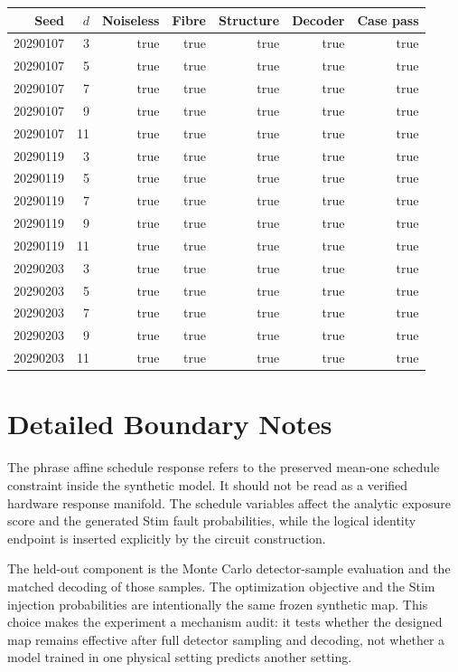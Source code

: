 \documentclass[11pt]{article}
\begin{document}
\begin{center}
\scriptsize
\begin{tabular}{rrrrrrr}
\toprule
Seed & $d$ & Noiseless & Fibre & Structure & Decoder & Case pass \\
\midrule
20290107 & 3 & true & true & true & true & true \\
20290107 & 5 & true & true & true & true & true \\
20290107 & 7 & true & true & true & true & true \\
20290107 & 9 & true & true & true & true & true \\
20290107 & 11 & true & true & true & true & true \\
20290119 & 3 & true & true & true & true & true \\
20290119 & 5 & true & true & true & true & true \\
20290119 & 7 & true & true & true & true & true \\
20290119 & 9 & true & true & true & true & true \\
20290119 & 11 & true & true & true & true & true \\
20290203 & 3 & true & true & true & true & true \\
20290203 & 5 & true & true & true & true & true \\
20290203 & 7 & true & true & true & true & true \\
20290203 & 9 & true & true & true & true & true \\
20290203 & 11 & true & true & true & true & true \\
\bottomrule
\end{tabular}
\end{center}

\clearpage
\section{Detailed Boundary Notes}
The phrase affine schedule response refers to the preserved mean-one schedule
constraint inside the synthetic model. It should not be read as a verified
hardware response manifold. The schedule variables affect the analytic exposure
score and the generated Stim fault probabilities, while the logical identity
endpoint is inserted explicitly by the circuit construction.

The held-out component is the Monte Carlo detector-sample evaluation and the
matched decoding of those samples. The optimization objective and the Stim
injection probabilities are intentionally the same frozen synthetic map. This
choice makes the experiment a mechanism audit: it tests whether the designed
map remains effective after full detector sampling and decoding, not whether a
model trained in one physical setting predicts another setting.
\end{document}
